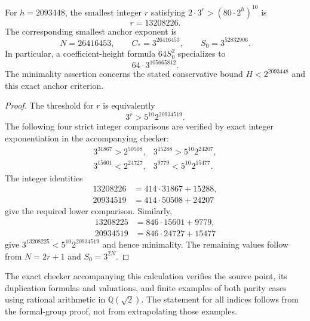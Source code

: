 \begin{corollary}\label{anchor3:numerical-constant}
For $h=2093448$, the smallest integer $r$ satisfying
$2\cdot3^r>(80\cdot2^h)^{10}$ is
\[
                         r=13208226.
\]
The corresponding smallest anchor exponent is
\[
 N=26416453,\qquad C_*=3^{26416453},\qquad
 S_0=3^{52832906}.
\]
In particular, a coefficient-height formula $64S_0^2$ specializes to
\[
                              64\cdot3^{105665812}.
\]
The minimality assertion concerns the stated conservative bound
$H<2^{2093448}$ and this exact anchor criterion.
\end{corollary}
\begin{proof}
The threshold for $r$ is equivalently
\[
                     3^r>5^{10}2^{20934519}.
\]
The following four strict integer comparisons are verified by exact
integer exponentiation in the accompanying checker:
\[
 \begin{array}{ll}
 3^{31867}>2^{50508},&
 3^{15288}>5^{10}2^{24207},\\
 3^{15601}<2^{24727},&
 3^{9779}<5^{10}2^{15477}.
 \end{array}
\]
The integer identities
\[
 \begin{split}
 13208226&=414\cdot31867+15288,\\
 20934519&=414\cdot50508+24207
 \end{split}
\]
give the required lower comparison.  Similarly,
\[
 \begin{split}
 13208225&=846\cdot15601+9779,\\
 20934519&=846\cdot24727+15477
 \end{split}
\]
give $3^{13208225}<5^{10}2^{20934519}$ and hence minimality.
The remaining values follow from $N=2r+1$ and $S_0=3^{2N}$.
\end{proof}

The exact checker accompanying this calculation verifies the source
point, its duplication formulas and valuations, and finite examples of
both parity cases using rational arithmetic in $\mathbb Q(\sqrt2)$.
The statement for all indices follows from the formal-group proof,
not from extrapolating those examples.
